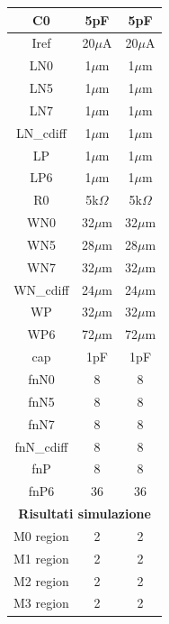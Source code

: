 \begin{longtable}{c|c|c|}
    \multicolumn{1}{|c|}{C0} & 5pF & 5pF \\ \hline
    \multicolumn{1}{|c|}{Iref} & 20$\mu$A & 20$\mu$A \\ \hline
    \multicolumn{1}{|c|}{LN0} & 1$\mu$m & 1$\mu$m \\ \hline
    \multicolumn{1}{|c|}{LN5} & 1$\mu$m & 1$\mu$m \\ \hline
    \multicolumn{1}{|c|}{LN7} & 1$\mu$m & 1$\mu$m \\ \hline
    \multicolumn{1}{|c|}{LN\_cdiff} & 1$\mu$m & 1$\mu$m \\ \hline
    \multicolumn{1}{|c|}{LP} & 1$\mu$m & 1$\mu$m \\ \hline
    \multicolumn{1}{|c|}{LP6} & 1$\mu$m & 1$\mu$m \\ \hline
    \multicolumn{1}{|c|}{R0} & 5k$\Omega$ & 5k$\Omega$ \\ \hline
    \multicolumn{1}{|c|}{WN0} & 32$\mu$m & 32$\mu$m \\ \hline
    \multicolumn{1}{|c|}{WN5} & 28$\mu$m & 28$\mu$m \\ \hline
    \multicolumn{1}{|c|}{WN7} & 32$\mu$m & 32$\mu$m \\ \hline
    \multicolumn{1}{|c|}{WN\_cdiff} & 24$\mu$m & 24$\mu$m \\ \hline
    \multicolumn{1}{|c|}{WP} & 32$\mu$m & 32$\mu$m \\ \hline
    \multicolumn{1}{|c|}{WP6} & 72$\mu$m & 72$\mu$m \\ \hline
    \multicolumn{1}{|c|}{cap} & 1pF & 1pF \\ \hline
    \multicolumn{1}{|c|}{fnN0} & 8 & 8 \\ \hline
    \multicolumn{1}{|c|}{fnN5} & 8 & 8 \\ \hline
    \multicolumn{1}{|c|}{fnN7} & 8 & 8 \\ \hline
    \multicolumn{1}{|c|}{fnN\_cdiff} & 8 & 8 \\ \hline
    \multicolumn{1}{|c|}{fnP} & 8 & 8 \\ \hline
    \multicolumn{1}{|c|}{fnP6} & 36 & 36 \\ \hline
    \multicolumn{3}{|c|}{\textbf{Risultati simulazione}} \\ \hline
    \multicolumn{1}{|c|}{M0 region} & 2 & 2 \\ \hline
    \multicolumn{1}{|c|}{M1 region} & 2 & 2 \\ \hline
    \multicolumn{1}{|c|}{M2 region} & 2 & 2 \\ \hline
    \multicolumn{1}{|c|}{M3 region} & 2 & 2 \\ \hline

\end{longtable}
